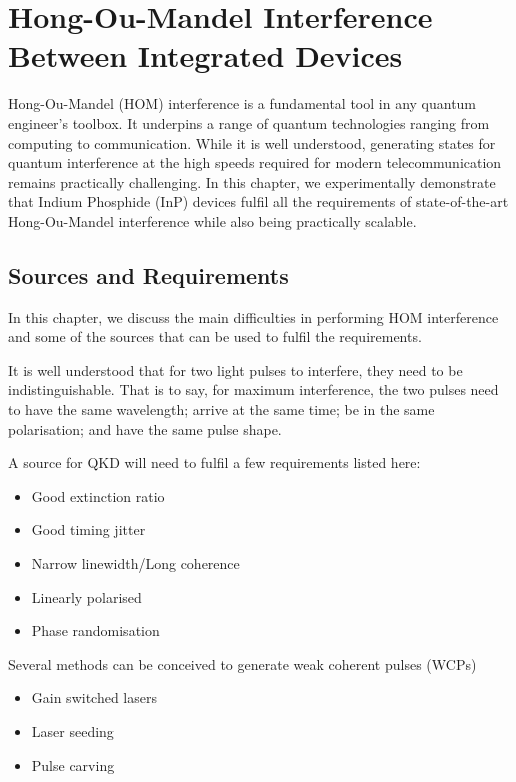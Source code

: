 %
%
\let\textcircled=\pgftextcircled
\chapter{Hong-Ou-Mandel Interference Between Integrated Devices}
\label{chap:hom}

Hong-Ou-Mandel (HOM) interference is a fundamental tool in any quantum engineer's toolbox. It underpins a range of quantum technologies ranging from computing to communication. While it is well understood, generating states for quantum interference at the high speeds required for modern telecommunication remains practically challenging. In this chapter, we experimentally demonstrate that Indium Phosphide (InP) devices fulfil all the requirements of state-of-the-art Hong-Ou-Mandel interference while also being practically scalable. 

\section{Sources and Requirements}
\label{sec:sources}

In this chapter, we discuss the main difficulties in performing HOM interference and some of the sources that can be used to fulfil the requirements. 

It is well understood that for two light pulses to interfere, they need to be indistinguishable. That is to say, for maximum interference, the two pulses need to have the same wavelength; arrive at the same time; be in the same polarisation; and have the same pulse shape.

A source for QKD will need to fulfil a few requirements listed here:

\begin{itemize}
	\item Good extinction ratio
	\item Good timing jitter
	\item Narrow linewidth/Long coherence
	\item Linearly polarised
	\item Phase randomisation
\end{itemize}

Several methods can be conceived to generate weak coherent pulses (WCPs)

\begin{itemize}
	\item Gain switched lasers
	\item Laser seeding
	\item Pulse carving
\end{itemize}


